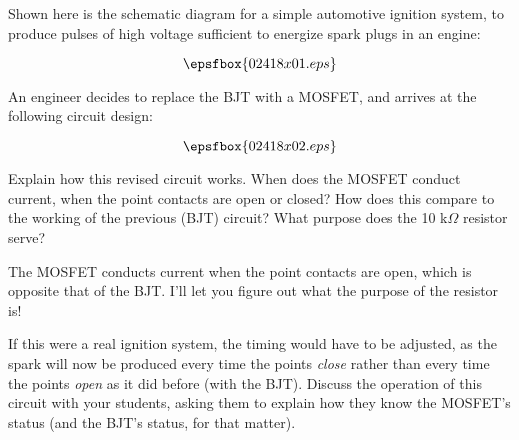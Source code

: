 

Shown here is the schematic diagram for a simple automotive ignition system, to produce pulses of high voltage sufficient to energize spark plugs in an engine:

$$\epsfbox{02418x01.eps}$$

An engineer decides to replace the BJT with a MOSFET, and arrives at the following circuit design:

$$\epsfbox{02418x02.eps}$$

Explain how this revised circuit works.  When does the MOSFET conduct current, when the point contacts are open or closed?  How does this compare to the working of the previous (BJT) circuit?  What purpose does the 10 k$\Omega$ resistor serve?







The MOSFET conducts current when the point contacts are open, which is opposite that of the BJT.  I'll let you figure out what the purpose of the resistor is!







If this were a real ignition system, the timing would have to be adjusted, as the spark will now be produced every time the points {\it close} rather than every time the points {\it open} as it did before (with the BJT).  Discuss the operation of this circuit with your students, asking them to explain how they know the MOSFET's status (and the BJT's status, for that matter).




